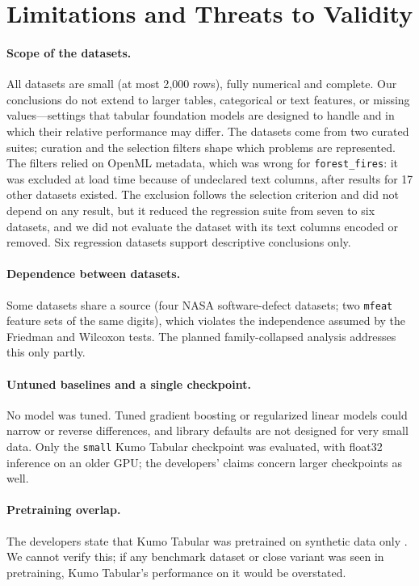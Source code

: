 \section{Limitations and Threats to Validity}
\label{sec:limitations}

\paragraph{Scope of the datasets.}
All datasets are small (at most 2{,}000 rows), fully numerical and complete. Our conclusions do not extend to larger
tables, categorical or text features, or missing values---settings that tabular foundation models are designed to
handle and in which their relative performance may differ. The datasets come from two curated suites; curation and the
selection filters shape which problems are represented. The filters relied on OpenML metadata, which was wrong for
\texttt{forest\_fires}: it was excluded at load time because of undeclared text columns, after results for 17 other
datasets existed. The exclusion follows the selection criterion and did not depend on any result, but it reduced the
regression suite from seven to six datasets, and we did not evaluate the dataset with its text columns encoded or
removed. Six regression datasets support descriptive conclusions only.

\paragraph{Dependence between datasets.}
Some datasets share a source (four NASA software-defect datasets; two \texttt{mfeat} feature sets of the same digits),
which violates the independence assumed by the Friedman and Wilcoxon tests. The planned family-collapsed analysis
addresses this only partly.

\paragraph{Untuned baselines and a single checkpoint.}
No model was tuned. Tuned gradient boosting or regularized linear models could narrow or reverse differences, and
library defaults are not designed for very small data. Only the \texttt{small} Kumo Tabular checkpoint was evaluated,
with float32 inference on an older GPU; the developers' claims concern larger checkpoints as well.

\paragraph{Pretraining overlap.}
The developers state that Kumo Tabular was pretrained on synthetic data only \citep{nvidia_kumo_blog}. We cannot verify
this; if any benchmark dataset or close variant was seen in pretraining, Kumo Tabular's performance on it would be
overstated.

